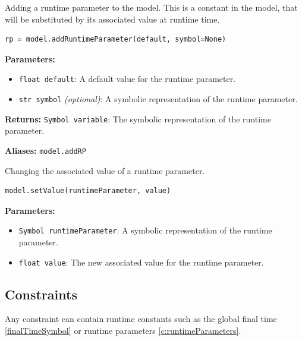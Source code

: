 \documentclass[12pt]{article}
\begin{document}
\begin{mdframed}[backgroundcolor=gray!10, roundcorner=10pt,
		linewidth=1pt]

	Adding a runtime parameter to the model. This is a constant in
	the model, that will be substituted by its associated value at runtime
	time.

	\begin{lstlisting}
rp = model.addRuntimeParameter(default, symbol=None)
		\end{lstlisting}
	\label{addRuntimeParameter}
	\textbf{Parameters:}
	\begin{itemize}
		\item \texttt{float default}: A default value for the
		      runtime parameter.
		\item \texttt{str symbol} \emph{(optional)}: A symbolic representation of
		      the runtime parameter.
	\end{itemize}

	\textbf{Returns:}
	\texttt{Symbol variable}: The symbolic representation of the
	runtime parameter.

	\textbf{Aliases:} \texttt{model.addRP}
\end{mdframed}

\begin{mdframed}[backgroundcolor=gray!10, roundcorner=10pt,
		linewidth=1pt]

	Changing the associated value of a runtime parameter.

	\begin{lstlisting}
model.setValue(runtimeParameter, value)
		\end{lstlisting}
	\label{setValue}
	\textbf{Parameters:}
	\begin{itemize}
		\item \texttt{Symbol runtimeParameter}: A symbolic
		      representation of the runtime parameter.
		\item \texttt{float value}: The new associated value
		      for the runtime parameter.
	\end{itemize}
\end{mdframed}

\subsection{Constraints}

Any constraint can contain runtime constants such as the global
final time \eqref{finalTimeSymbol} or runtime parameters
\eqref{c:runtimeParameters}.
\end{document}
